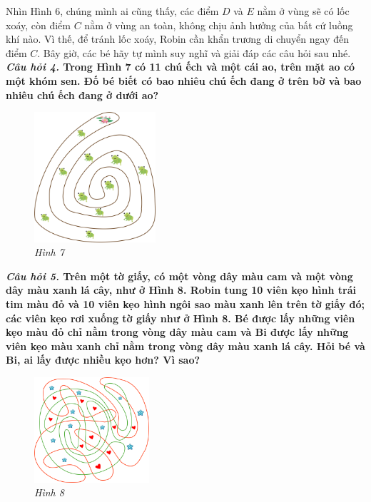 	Nhìn Hình 6, chúng mình ai cũng thấy, các điểm $D$ và $E$ nằm ở vùng sẽ có lốc xoáy, còn điểm $C$ nằm ở vùng an toàn, không chịu ảnh hưởng của bất cứ luồng khí nào. Vì thế, để tránh lốc xoáy, Robin cần khẩn trương di chuyển ngay đến điểm $C$.
	\vskip 0.05cm
	Bây giờ, các bé hãy tự mình suy nghĩ và giải đáp các câu hỏi sau nhé.
	\vskip 0.1cm
	\textbf{\textit{Câu hỏi 4.} {\color{abc}Trong Hình 7 có 11 chú ếch và một cái ao, trên mặt ao có một khóm sen. Đố bé biết có bao nhiêu chú ếch đang ở trên bờ và bao nhiêu chú ếch đang ở dưới ao?}}
	\begin{figure}[H]
		\centering
		\vspace*{-5pt}
		\captionsetup{labelformat= empty, justification=centering}
		\includegraphics[width=0.4\textwidth]{pic11}
		\caption{\small\textit{Hình 7}}
		\vspace*{-10pt}
	\end{figure}
	\textbf{\textit{Câu hỏi 5.} {\color{abc}Trên một tờ giấy, có một vòng dây màu cam và một vòng dây màu xanh lá cây, như ở Hình 8. Robin tung 10 viên kẹo hình trái tim màu đỏ và 10 viên kẹo hình ngôi sao màu xanh lên trên tờ giấy đó; các viên kẹo rơi xuống tờ giấy như ở Hình 8. Bé được lấy những viên kẹo màu đỏ chỉ nằm trong vòng dây màu cam và Bi được lấy những viên kẹo màu xanh chỉ nằm trong vòng dây màu  xanh lá cây. Hỏi bé và Bi, ai lấy được nhiều kẹo hơn? Vì sao?}}
	\begin{figure}[H]
		\centering
		\vspace*{-5pt}
		\captionsetup{labelformat= empty, justification=centering}
		\includegraphics[width=0.38\textwidth]{8}
		\caption{\small\textit{Hình 8}}
		\vspace*{-10pt}
	\end{figure}
